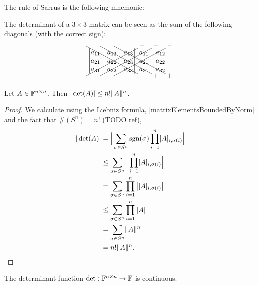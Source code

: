 The rule of Sarrus is the following mnemonic:
\begin{corollary}
The determinant of a $3\times 3$ matrix can be seen as the sum of the following diagonals (with the correct sign):
\[ \begin{tikzpicture}
\node (A) {$\begin{vmatrix}
a_{11} & a_{12} & a_{13} \\
a_{21} & a_{22} & a_{23} \\
a_{31} & a_{32} & a_{33}
\end{vmatrix}$};
\node[right of=A, node distance=5.8em] (B) {$\begin{matrix}
a_{11} & a_{12} \\
a_{21} & a_{22} \\
a_{31} & a_{32}
\end{matrix}$};
\draw (A.south west) -- ++(7.5em,4em) ++(.2,.1) node {--};
\draw (A.south west) ++(2em,0) --  ++(7.5em,4em) ++(.2,.1) node {--};
\draw (A.south west) ++(4em,0) --  ++(7.5em,4em) ++(.2,.1) node {--};
\draw (A.north west) -- ++(7.5em,-4em) ++(.2,-.1) node {+};
\draw (A.north west) ++(2em,0) --  ++(7.5em,-4em) ++(.2,-.1) node {+};
\draw (A.north west) ++(4em,0) --  ++(7.5em,-4em) ++(.2,-.1) node {+};
\end{tikzpicture} \]
\end{corollary}
\begin{corollary} \label{determinantBound}
Let $A\in \mathbb{F}^{n\times n}$. Then $|\det(A)| \leq n! \lVert A\rVert^n$.
\end{corollary}
\begin{proof}
We calculate using the Liebniz formula, \ref{matrixElementsBoundedByNorm} and the fact that $\#(S^n) = n!$ (TODO ref),
\begin{align*}
|\det(A)| &= \Big|\sum_{\sigma\in S^n}\operatorname{sgn}(\sigma)\prod_{i=1}^n[A]_{i,\sigma(i)}\Big| \\
&\leq \sum_{\sigma\in S^n}\Big|\prod_{i=1}^n[A]_{i,\sigma(i)}\Big| \\
&= \sum_{\sigma\in S^n}\prod_{i=1}^n\big|[A]_{i,\sigma(i)}\big| \\
&\leq \sum_{\sigma\in S^n}\prod_{i=1}^n\lVert A\rVert \\
&= \sum_{\sigma\in S^n}\lVert A\rVert^n \\
&= n!\lVert A\rVert^n.
\end{align*}
\end{proof}
\begin{corollary}
The determinant function $\det: \mathbb{F}^{n\times n}\to \mathbb{F}$ is continuous.
\end{corollary}

